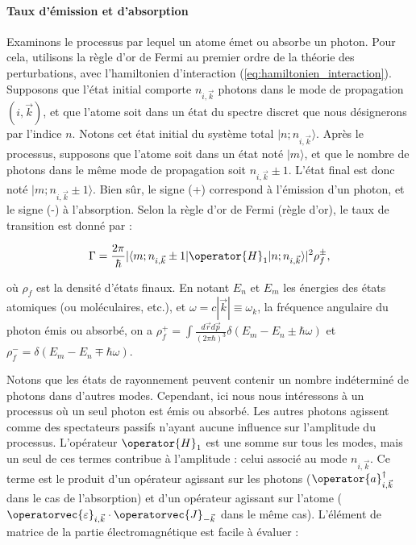 \paragraph{Taux d'émission et d'absorption}
Examinons le processus par lequel un atome émet ou absorbe un photon. Pour cela, utilisons la règle d'or de Fermi au premier ordre de la théorie des perturbations, avec l'hamiltonien d'interaction (\ref{eq:hamiltonien_interaction}). Supposons que l'état initial comporte $n_{i,\vec{k}}$ photons dans le mode de propagation $(i,\vec{k})$, et que l'atome soit dans un état du spectre discret que nous désignerons par l'indice $n$. Notons cet état initial du système total $|n;n_{i,\vec{k}}\rangle$. Après le processus, supposons que l'atome soit dans un état noté $|m\rangle$, et que le nombre de photons dans le même mode de propagation soit $n_{i,\vec{k}} \pm 1$. L'état final est donc noté $|m; n_{i,\vec{k}} \pm 1\rangle$. Bien sûr, le signe (+) correspond à l'émission d'un photon, et le signe (-) à l'absorption. Selon la règle d'or de Fermi (règle d'or), le taux de transition est donné par :

\begin{eqnarray}
\Gamma = \frac{ 2 \pi}{\hbar}  \vert \langle m; n_{i,\vec{k}} \pm 1 | \operator{{H}}_1 | n; n_{i,\vec{k}} \rangle  \vert^2 \rho_f^\pm ,
\end{eqnarray}

où $\rho_f$ est la densité d'états finaux. En notant $E_n$ et $E_m$ les énergies des états atomiques (ou moléculaires, etc.), et $\omega = c|\vec{k}| \equiv  \omega_k$, la fréquence angulaire du photon émis ou absorbé, on a $\rho_f^+ = \int  \frac{d \vec{r} d \vec{p} }{ (2 \pi \hbar)^3 } \delta(E_m - E_n \pm \hbar\omega)$ et $\rho_{f}^- = \delta(E_m - E_n \mp \hbar\omega)$.

Notons que les états de rayonnement peuvent contenir un nombre indéterminé de photons dans d'autres modes. Cependant, ici nous nous intéressons à un processus où un seul photon est émis ou absorbé. Les autres photons agissent comme des spectateurs passifs n'ayant aucune influence sur l'amplitude du processus. L'opérateur $\operator{{H}}_1$ est une somme sur tous les modes, mais un seul de ces termes contribue à l'amplitude : celui associé au mode $n_{i,\vec{k}}$. Ce terme est le produit d'un opérateur agissant sur les photons ($\operator{a}^{\dagger}_{i,\vec{k}}$ dans le cas de l'absorption) et d'un opérateur agissant sur l'atome ($\operatorvec{\varepsilon}_{i , \vec{k}} \cdot \operatorvec{J}_{- \vec{k}} $ dans le même cas). L'élément de matrice de la partie électromagnétique est facile à évaluer :

